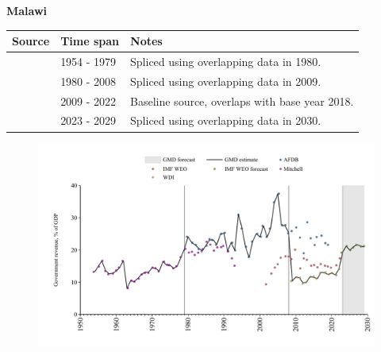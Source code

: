 \documentclass[12pt,a4paper,landscape]{article}
\begin{document}
\begin{adjustbox}{max totalsize={\paperwidth}{\paperheight},center}
\begin{minipage}[t][\textheight][t]{\textwidth}
\vspace*{0.5cm}
{}
\begin{center}
{\Large\bfseries Malawi}
\end{center}
\vspace{0.5cm}
\begin{table}[H]
\centering
\small
\begin{tabular}{|l|l|l|}
\hline
\textbf{Source} & \textbf{Time span} & \textbf{Notes} \\
\hline
\rowcolor{white}\cite{Mitchell}& 1954 - 1979 &Spliced using overlapping data in 1980.\\
\rowcolor{lightgray}\cite{AFDB}& 1980 - 2008 &Spliced using overlapping data in 2009.\\
\rowcolor{white}\cite{WDI}& 2009 - 2022 &Baseline source, overlaps with base year 2018.\\
\rowcolor{lightgray}\cite{IMF_WEO_forecast}& 2023 - 2029 &Spliced using overlapping data in 2030.\\
\hline
\end{tabular}
\end{table}
\begin{figure}[H]
\centering
\includegraphics[width=\textwidth,height=0.6\textheight,keepaspectratio]{graphs/MWI_govrev_GDP.pdf}
\end{figure}
\end{minipage}
\end{adjustbox}
\end{document}
